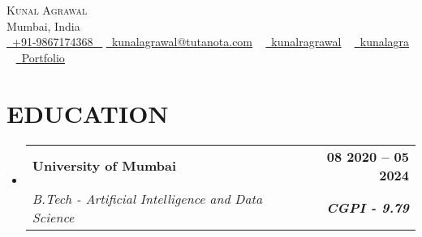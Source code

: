 \documentclass[letterpaper,11pt]{article}
\makeatletter
\newcommand{\resumeItem}[1]{
  \item\small{
    {#1 \vspace{-2pt}}
  }
}
\newcommand{\resumeSubheading}[4]{
  \vspace{-2pt}\item
    \begin{tabular*}{1.0\textwidth}[t]{l@{\extracolsep{\fill}}r}
      \textbf{\large#1} & \textbf{\small #2} \\
      \textit{\large#3} & \textit{\small #4} \\
      
    \end{tabular*}\vspace{-7pt}
}
\newcommand{\resumeSubHeadingListStart}{\begin{itemize}[leftmargin=0.0in, label={}]}
\newcommand{\resumeSubHeadingListEnd}{\end{itemize}}
\makeatother
\begin{document}


\begin{center}
    {\Huge \scshape {Kunal Agrawal}} \\ \vspace{1pt}
    Mumbai, India \\ \vspace{1pt}
    \small \href{tel:+919867174368}{ \raisebox{-0.1\height}{\faPhone*}\ \underline{+91-9867174368} ~} \href{mailto:kunalagrawal@tutanota.com}{\raisebox{-0.2\height}{\faEnvelope[regular]}\  \underline{kunalagrawal@tutanota.com}} ~ 
    \href{https://linkedin.com/in/kunalragrawal}{\raisebox{-0.2\height}\faLinkedinIn\ \underline{kunalragrawal}}  ~
    \href{https://github.com/kunalagra}{\raisebox{-0.2\height}\faGithub\ \underline{kunalagra}} ~
    \href{https://kunalagrawal.vercel.app/}{\raisebox{-0.2\height}{\faLink}\ \underline{Portfolio}}
    \vspace{-8pt}
\end{center}


\section{EDUCATION}
  \resumeSubHeadingListStart
    \resumeSubheading
      {University of Mumbai}{08 2020 -- 05 2024}
      {B.Tech - Artificial Intelligence and Data Science}{\textbf{CGPI - 9.79}}
  
      
  \resumeSubHeadingListEnd
  

\end{document}
